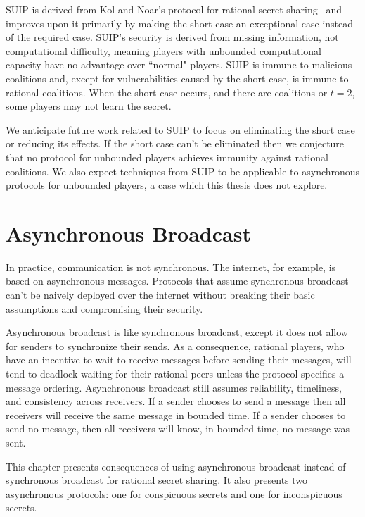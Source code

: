 \documentclass[12pt]{dalcsthesis}
\begin{document}
SUIP is derived from Kol and Noar's protocol for rational secret sharing~\cite{kol08} and improves upon it primarily by making the short case an exceptional case instead of the required case. SUIP's security is derived from missing information, not computational difficulty, meaning players with unbounded computational capacity have no advantage over ``normal" players. SUIP is immune to malicious coalitions and, except for vulnerabilities caused by the short case, is immune to rational coalitions. When the short case occurs, and there are coalitions or $t=2$, some players may not learn the secret.

We anticipate future work related to SUIP to focus on eliminating the short case or reducing its effects. If the short case can't be eliminated then we conjecture that no protocol for unbounded players achieves immunity against rational coalitions. We also expect techniques from SUIP to be applicable to asynchronous protocols for unbounded players, a case which this thesis does not explore.





\chapter{Asynchronous Broadcast}
\label{chapter:Asynchronous}

In practice, communication is not synchronous. The internet, for example, is based on asynchronous messages. Protocols that assume synchronous broadcast can't be naively deployed over the internet without breaking their basic assumptions and compromising their security.

Asynchronous broadcast is like synchronous broadcast, except it does not allow for senders to synchronize their sends. As a consequence, rational players, who have an incentive to wait to receive messages before sending their messages, will tend to deadlock waiting for their rational peers unless the protocol specifies a message ordering. Asynchronous broadcast still assumes reliability, timeliness, and consistency across receivers. If a sender chooses to send a message then all receivers will receive the same message in bounded time. If a sender chooses to send no message, then all receivers will know, in bounded time, no message was sent.

This chapter presents consequences of using asynchronous broadcast instead of synchronous broadcast for rational secret sharing. It also presents two asynchronous protocols: one for conspicuous secrets and one for inconspicuous secrets.
\end{document}
